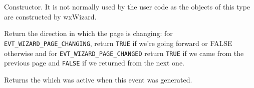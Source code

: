 \label{wxwizardeventwxwizardevent}


Constructor. It is not normally used by the user code as the objects of this
type are constructed by wxWizard.

\label{wxwizardeventgetdirection}


Return the direction in which the page is changing: for {\tt
EVT\_WIZARD\_PAGE\_CHANGING}, return {\tt TRUE} if we're going forward or
FALSE otherwise and for {\tt EVT\_WIZARD\_PAGE\_CHANGED} return {\tt TRUE} if
we came from the previous page and {\tt FALSE} if we returned from the next
one.

\label{wxwizardeventgetpage}


Returns the  which was active when this
event was generated.

